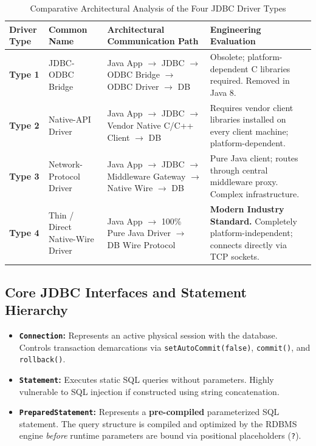\begin{table}[htbp]
\centering
\small
\caption{Comparative Architectural Analysis of the Four JDBC Driver Types}
\label{tab:jdbc_driver_types}
\begin{tabularx}{\textwidth}{p{2.6cm} p{3.2cm} p{3.8cm} X}
\toprule
\textbf{Driver Type} & \textbf{Common Name} & \textbf{Architectural Communication Path} & \textbf{Engineering Evaluation} \\
\midrule
\textbf{Type 1} & JDBC-ODBC Bridge & Java App $\to$ JDBC $\to$ ODBC Bridge $\to$ ODBC Driver $\to$ DB & Obsolete; platform-dependent C libraries required. Removed in Java 8. \\
\textbf{Type 2} & Native-API Driver & Java App $\to$ JDBC $\to$ Vendor Native C/C++ Client $\to$ DB & Requires vendor client libraries installed on every client machine; platform-dependent. \\
\textbf{Type 3} & Network-Protocol Driver & Java App $\to$ JDBC $\to$ Middleware Gateway $\to$ Native Wire $\to$ DB & Pure Java client; routes through central middleware proxy. Complex infrastructure. \\
\textbf{Type 4} & Thin / Direct Native-Wire Driver & Java App $\to$ 100\% Pure Java Driver $\to$ DB Wire Protocol & \textbf{Modern Industry Standard.} Completely platform-independent; connects directly via TCP sockets. \\
\bottomrule
\end{tabularx}
\end{table}

\subsection{Core JDBC Interfaces and Statement Hierarchy}
\begin{itemize}
    \item \textbf{\texttt{Connection}:} Represents an active physical session with the database. Controls transaction demarcations via \texttt{setAutoCommit(false)}, \texttt{commit()}, and \texttt{rollback()}.
    \item \textbf{\texttt{Statement}:} Executes static SQL queries without parameters. Highly vulnerable to SQL injection if constructed using string concatenation.
    \item \textbf{\texttt{PreparedStatement}:} Represents a \textbf{pre-compiled} parameterized SQL statement. The query structure is compiled and optimized by the RDBMS engine \textit{before} runtime parameters are bound via positional placeholders (\texttt{?}).
\end{itemize}

